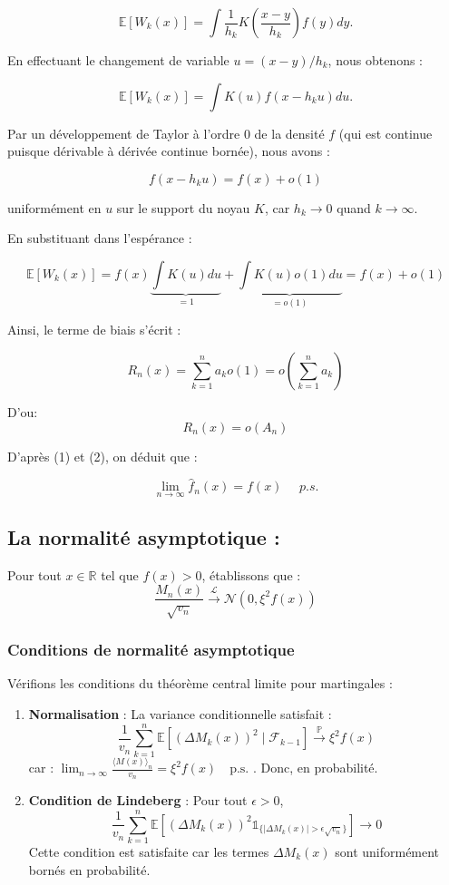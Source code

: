 \documentclass[12pt]{article}
\begin{document}
\[ \mathbb{E}[W_k(x)] = \int \frac{1}{h_k} K\left(\frac{x-y}{h_k}\right) f(y) dy. \]

En effectuant le changement de variable $u = (x-y)/h_k$, nous obtenons :

\[ \mathbb{E}[W_k(x)] = \int K(u) f(x - h_k u) du. \]

Par un développement de Taylor à l'ordre 0 de la densité $f$ (qui est continue puisque dérivable à dérivée continue bornée), nous avons :

\[ f(x - h_k u) = f(x) + o(1) \]

uniformément en $u$ sur le support du noyau $K$, car $h_k \to 0$ quand $k \to \infty$.

En substituant dans l'espérance :

\[ \mathbb{E}[W_k(x)] = f(x) \underbrace{\int K(u) du}_{=1} + \underbrace{\int K(u) o(1) du}_{=o(1)} = f(x) + o(1) \]

Ainsi, le terme de biais s'écrit :

\[ R_n(x) = \sum_{k=1}^n a_k o(1) =   o(\sum_{k=1}^n a_k) \]

D'ou:  
\[ R_n(x) =   o(A_n) \]

D'après (1) et (2), on déduit que :

\[ \boxed{\lim_{n \to \infty} \hat{f}_n(x) = f(x) ~~~~~~  p.s.}\]





\subsection*{La normalité asymptotique : }

Pour tout $x \in \mathbb{R}$ tel que $f(x) > 0$,  établissons que :
\[
\frac{M_n(x)}{\sqrt{v_n}} \xrightarrow{\mathcal{L}} \mathcal{N}(0, \xi^2 f(x))
\]





\subsubsection*{Conditions de normalité asymptotique}
Vérifions les conditions du théorème central limite pour martingales :

\begin{enumerate}
\item \textbf{Normalisation} :
La variance conditionnelle satisfait :
\[
\frac{1}{v_n} \sum_{k=1}^n \mathbb{E}[(\Delta M_k(x))^2 \mid \mathcal{F}_{k-1}] \xrightarrow{\mathbb{P}} \xi^2 f(x)
\]
car : $\lim_{n \to \infty} \frac{\langle M(x) \rangle_n}{v_n} = \xi^2 f(x) \quad \text{p.s.}$ . Donc, en probabilité.

\item \textbf{Condition de Lindeberg} :
Pour tout $\epsilon > 0$,
\[
\frac{1}{v_n} \sum_{k=1}^n \mathbb{E}\left[(\Delta M_k(x))^2 \mathbb{1}_{\{|\Delta M_k(x)| > \epsilon \sqrt{v_n}\}}\right] \to 0
\]
Cette condition est satisfaite car les termes $\Delta M_k(x)$ sont uniformément bornés en probabilité.
\end{enumerate}
\end{document}
